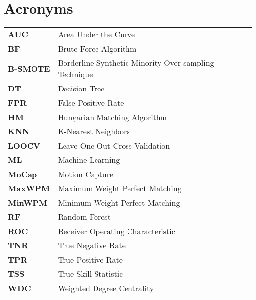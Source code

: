 \section*{\Huge Acronyms}

\begin{table}[H]
    \renewcommand{\arraystretch}{1.5} %
    \setlength{\tabcolsep}{20pt}
    \begin{tabular}{l l} 
        \textbf{AUC} & Area Under the Curve \\
        \textbf{BF} & Brute Force Algorithm \\
        \textbf{B-SMOTE} & Borderline Synthetic Minority Over-sampling Technique \\
        \textbf{DT} & Decision Tree \\
        \textbf{FPR} & False Positive Rate \\
        \textbf{HM} & Hungarian Matching Algorithm \\
        \textbf{KNN} & K-Nearest Neighbors \\
        \textbf{LOOCV} & Leave-One-Out Cross-Validation \\
        \textbf{ML} & Machine Learning \\
        \textbf{MoCap} & Motion Capture \\
        \textbf{MaxWPM} & Maximum Weight Perfect Matching \\
        \textbf{MinWPM} & Minimum Weight Perfect Matching \\
        \textbf{RF} & Random Forest \\
        \textbf{ROC} & Receiver Operating Characteristic \\
        \textbf{TNR} & True Negative Rate \\
        \textbf{TPR} & True Positive Rate \\
        \textbf{TSS} & True Skill Statistic \\
        \textbf{WDC} & Weighted Degree Centrality \\
    \end{tabular}
\end{table}

